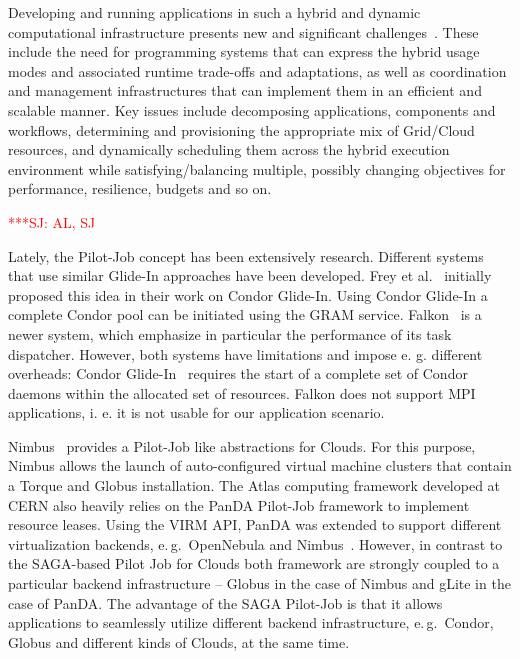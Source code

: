 \documentclass[conference,final]{IEEEtran}
\newcommand{\jhanote}[1]{ {\textcolor{red} { ***SJ: #1 }}}
\newcommand{\jhanote}[1]{}
\begin{document}
Developing and running applications in such a hybrid and dynamic
computational infrastructure presents new and significant
challenges~\cite{cloud-grid-autonomics}. These include the need for
programming systems that can express the hybrid usage modes and
associated runtime trade-offs and adaptations, as well as coordination
and management infrastructures that can implement them in an efficient
and scalable manner. Key issues include decomposing applications,
components and workflows, determining and provisioning the appropriate
mix of Grid/Cloud resources, and dynamically scheduling them across
the hybrid execution environment while satisfying/balancing multiple,
possibly changing objectives for performance, resilience, budgets and
so on.

 \jhanote{AL, SJ}

Lately, the Pilot-Job concept has been extensively research.
Different systems that use similar Glide-In approaches have been
developed. Frey et al.~\cite{citeulike:291860} initially proposed this idea in their
work on Condor Glide-In. Using Condor Glide-In a complete Condor pool
can be initiated using the GRAM service. Falkon~\cite{1362680} is a
newer system, which emphasize in particular the performance of its
task dispatcher. However, both systems have limitations and impose
e. g. different overheads: Condor Glide-In~\cite{citeulike:291860}
requires the start of a complete set of Condor daemons within the
allocated set of resources. Falkon does not support MPI applications,
i. e. it is not usable for our application scenario.

Nimbus~\cite{10.1109/MIC.2009.94} provides a Pilot-Job like
abstractions for Clouds. For this purpose, Nimbus allows the launch of
auto-configured virtual machine clusters that contain a Torque and
Globus installation.  The Atlas computing framework developed at CERN
also heavily relies on the PanDA Pilot-Job framework to implement
resource leases. Using the VIRM API, PanDA was extended to support
different virtualization backends, e.\,g.\ OpenNebula and
Nimbus~\cite{1555338}. However, in contrast to the SAGA-based Pilot
Job for Clouds both framework are strongly coupled to a particular
backend infrastructure -- Globus in the case of Nimbus and gLite in
the case of PanDA. The advantage of the SAGA Pilot-Job is that it
allows applications to seamlessly utilize different backend
infrastructure, e.\,g.\ Condor, Globus and different kinds of Clouds,
at the same time.


\end{document}
